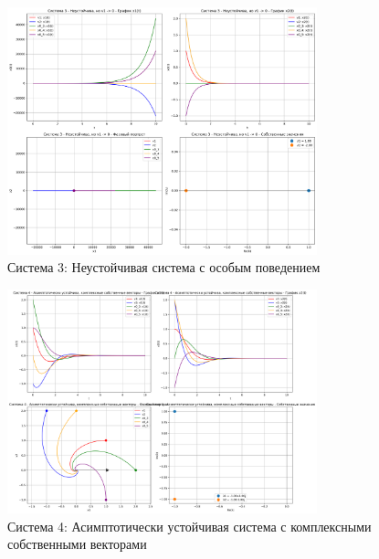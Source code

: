 \begin{figure}[h!]
\centering
\includegraphics[width=0.8\textwidth]{images/task1/система_3_-_неустойчива,_но_v1_->_0.png}
\caption{Система 3: Неустойчивая система с особым поведением}
\label{fig:system3}
\end{figure}

\begin{figure}[h!]
\centering
\includegraphics[width=0.8\textwidth]{images/task1/система_4_-_асимптотически_устойчива,_комплексные_собственные_векторы.png}
\caption{Система 4: Асимптотически устойчивая система с комплексными собственными векторами}
\label{fig:system4}
\end{figure}

